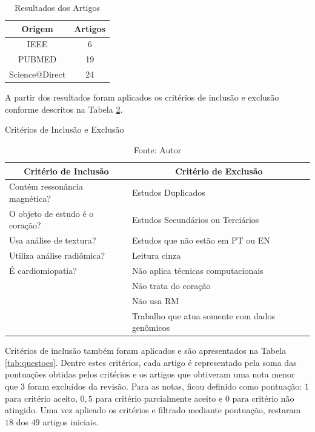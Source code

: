 \begin{table}[hbtp]
    \centering
    \renewcommand{\arraystretch}{1.4} %
    \begin{tabular}{|c|c|}
    \hline 
          \textbf{Origem} & \textbf{Artigos}  \\ 
    \hline 
        IEEE & 6 \\ 
        PUBMED & 19 \\ 
        Science@Direct & 24 \\ 
    \hline 
    \end{tabular} 
    \caption{Resultados dos Artigos}
    \label{tab:resultado_busca}
\end{table}

A partir dos resultados foram aplicados os critérios de inclusão e exclusão conforme descritos na Tabela \ref{tab:criterios}.

\begin{table}[hbtp]
    \centering
    \caption{Critérios de Inclusão e Exclusão}
    \renewcommand{\arraystretch}{1.4} %
    \begin{tabular}{|l|l|}
    \hline 
          \multicolumn{1}{|c|}{\textbf{Critério de Inclusão}} & \multicolumn{1}{c|}{\textbf{Critério de Exclusão}}  \\ 
    \hline 
        \quad Contém ressonância magnética? & \quad Estudos Duplicados   \\ 
        \quad O objeto de estudo é o coração? & \quad Estudos Secundários ou Terciários \\
        \quad Usa análise de textura? & \quad Estudos que não estão em PT ou EN\\
        \quad Utiliza análise radiômica? & \quad Leitura cinza  \\
        \quad É cardiomiopatia? & \quad Não aplica técnicas computacionais\\
        & \quad Não trata do coração \\
        & \quad Não usa RM \\
        & \quad Trabalho que atua somente com dados genômicos \\ 
    \hline 
    \end{tabular} 
    \caption*{Fonte: Autor}
    \label{tab:criterios}
\end{table}

Critérios de inclusão também foram aplicados e são apresentados na Tabela \ref{tab:questoes}. Dentre estes critérios, cada artigo é representado pela soma das pontuações obtidas pelos critérios e os artigos que obtiveram uma nota menor que 3 foram excluídos da revisão. Para as notas, ficou definido como pontuação: $1$ para critério aceito, $0,5$ para critério parcialmente aceito e $0$ para critério não atingido. Uma vez aplicado os critérios e filtrado mediante pontuação, restaram $18$ dos $49$ artigos iniciais.


